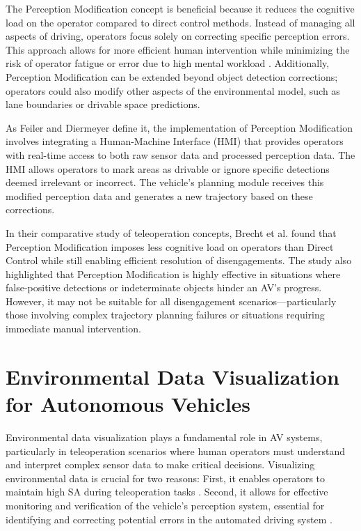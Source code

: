 The Perception Modification concept is beneficial because
it reduces the cognitive load on the operator compared to direct control methods.
Instead of managing all aspects of driving, operators focus solely on correcting
specific perception errors. This approach allows for more efficient human
intervention while minimizing the risk of operator fatigue or error due to
high mental workload \cite{Brecht}. Additionally, Perception Modification can
be extended beyond object detection corrections; operators could also modify other
aspects of the environmental model, such as lane boundaries or drivable space predictions.

As Feiler and Diermeyer \cite{Feiler2021ThePM,feiler2023perception} define it, the implementation of
Perception Modification involves integrating a  Human-Machine Interface (HMI) that provides operators with real-time access to both raw sensor data and processed perception data. The HMI allows operators to
mark areas as drivable or ignore specific detections deemed irrelevant or incorrect. The vehicle's planning module receives this modified perception data and generates a new trajectory based on these corrections.

In their comparative study of teleoperation concepts, Brecht et al. \cite{Brecht} found
that Perception Modification imposes less cognitive load on operators than
Direct Control while still enabling efficient resolution of disengagements.
The study also highlighted that Perception Modification is highly effective in
situations where false-positive detections or indeterminate objects hinder an AV's progress.
However, it may not be suitable for all disengagement scenarios—particularly those
involving complex trajectory planning failures or situations requiring immediate manual intervention.

\section{Environmental Data Visualization for Autonomous Vehicles}
Environmental data visualization plays a fundamental role in \ac{AV} systems,
particularly in teleoperation scenarios where human operators must understand and interpret
complex sensor data to make critical decisions.
Visualizing environmental data is crucial for two reasons: First, it enables operators to
maintain high \ac{SA} during
teleoperation tasks \cite{Gnatzig}. Second, it allows for effective monitoring and verification
of the vehicle's perception system, essential for identifying and correcting potential errors
in the automated driving system \cite{feiler2023perception}.

